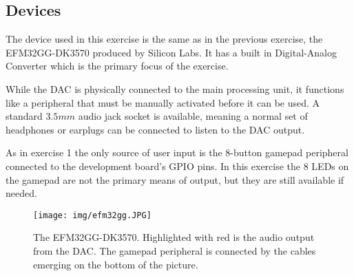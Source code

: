 \subsection{Devices}
The device used in this exercise is the same as in the previous exercise, the EFM32GG-DK3570 produced by Silicon Labs. It has a built in Digital-Analog Converter which is the primary focus of the exercise.

While the DAC is physically connected to the main processing unit, it functions like a peripheral that must be manually activated before it can be used. A standard $3.5mm$ audio jack socket is available, meaning a normal set of headphones or earplugs can be connected to listen to the DAC output.

As in exercise 1 the only source of user input is the 8-button gamepad peripheral connected to the development board's GPIO pins. In this exercise the 8 LEDs on the gamepad are not the primary means of output, but they are still available if needed.

\begin{figure}[h!]
\texttt{[image: img/efm32gg.JPG]}
\caption{The EFM32GG-DK3570. Highlighted with red is the audio output from the DAC. The gamepad peripheral is connected by the cables emerging on the bottom of the picture.}
\label{fig:efm32gg}
\end{figure}
